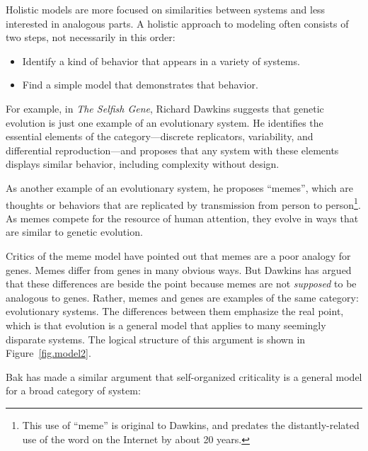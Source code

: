 \documentclass[12pt]{book}
\theoremstyle{exercise}
\begin{document}
Holistic models are more focused on similarities between systems and
less interested in analogous parts.  A holistic approach to modeling
often consists of two steps, not necessarily in this order:


\begin{itemize}

\item Identify a kind of behavior that appears in a variety of
systems.

\item Find a simple model that demonstrates that behavior.

\end{itemize}

For example, in {\em The Selfish Gene}, Richard Dawkins suggests that
genetic evolution is just one example of an evolutionary system.  He
identifies the essential elements of the category---discrete
replicators, variability, and differential reproduction---and proposes
that any system with these elements displays similar
behavior, including complexity without design.


As another example of an evolutionary system, he proposes ``memes'',
which are thoughts or behaviors that are replicated by transmission
from person to person\footnote{This use of ``meme'' is original to
  Dawkins, and predates the distantly-related use of the word on the
  Internet by about 20 years.}.  As memes compete for the resource of
human attention, they evolve in ways that are similar to genetic
evolution.


Critics of the meme model have pointed out that
memes are a poor analogy for genes.  Memes differ from genes in many
obvious ways.  But Dawkins has argued that these differences are
beside the point because memes are not {\em supposed} to be analogous
to genes.  Rather, memes and genes are examples of the same
category: evolutionary systems.  The differences between them
emphasize the real point, which is that evolution is a general model
that applies to many seemingly disparate systems.  The logical
structure of this argument is shown in Figure~\ref{fig.model2}.


Bak has made a similar argument that self-organized criticality is a
general model for a broad category of system:
\end{document}
